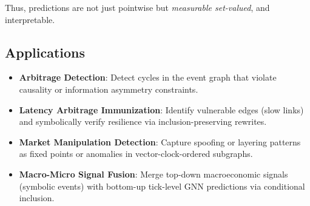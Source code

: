 Thus, predictions are not just pointwise but \emph{measurable set-valued}, and interpretable.

\subsection{Applications}

\begin{itemize}
    \item \textbf{Arbitrage Detection}: Detect cycles in the event graph that violate causality or information asymmetry constraints.
    \item \textbf{Latency Arbitrage Immunization}: Identify vulnerable edges (slow links) and symbolically verify resilience via inclusion-preserving rewrites.
    \item \textbf{Market Manipulation Detection}: Capture spoofing or layering patterns as fixed points or anomalies in vector-clock-ordered subgraphs.
    \item \textbf{Macro-Micro Signal Fusion}: Merge top-down macroeconomic signals (symbolic events) with bottom-up tick-level GNN predictions via conditional inclusion.
\end{itemize}
